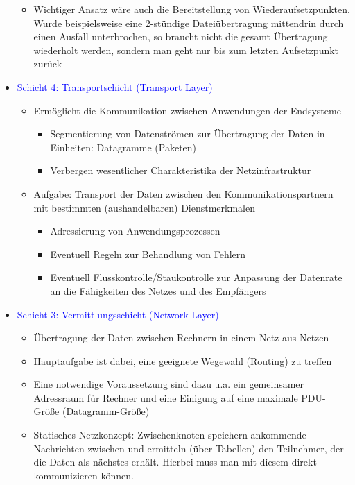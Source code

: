 \begin{itemize}
\begin{itemize}
        \item Wichtiger Ansatz wäre auch die Bereitstellung von Wiederaufsetzpunkten. Wurde beispielsweise eine 2-stündige Dateiübertragung mittendrin durch einen Ausfall unterbrochen, so braucht nicht die gesamt Übertragung wiederholt werden, sondern man geht nur bis zum letzten Aufsetzpunkt zurück
    \end{itemize}
    \item \textcolor{blue}{Schicht 4: Transportschicht (Transport Layer)}
    \begin{itemize}
        \item Ermöglicht die Kommunikation zwischen Anwendungen der Endsysteme
        \begin{itemize}
            \item Segmentierung von Datenströmen zur Übertragung der Daten in Einheiten: Datagramme (Paketen)
            \item Verbergen wesentlicher Charakteristika der Netzinfrastruktur
        \end{itemize}
        \item Aufgabe: Transport der Daten zwischen den Kommunikationspartnern mit bestimmten (aushandelbaren) Dienstmerkmalen
        \begin{itemize}
            \item Adressierung von Anwendungsprozessen
            \item Eventuell Regeln zur Behandlung von Fehlern
            \item Eventuell Flusskontrolle/Staukontrolle zur Anpassung der Datenrate an die Fähigkeiten des Netzes und des Empfängers
        \end{itemize}
    \end{itemize}
    \item \textcolor{blue}{Schicht 3: Vermittlungsschicht (Network Layer)}
    \begin{itemize}
        \item Übertragung der Daten zwischen Rechnern in einem Netz aus Netzen
        \item Hauptaufgabe ist dabei, eine geeignete Wegewahl (Routing) zu treffen
        \item Eine notwendige Voraussetzung sind dazu u.a. ein gemeinsamer Adressraum für Rechner und eine Einigung auf eine maximale PDU-Größe (Datagramm-Größe)
        \item Statisches Netzkonzept: Zwischenknoten speichern ankommende Nachrichten zwischen und ermitteln (über Tabellen) den Teilnehmer, der die Daten als nächstes erhält. Hierbei muss man mit diesem direkt kommunizieren können.

\end{itemize}
\end{itemize}
